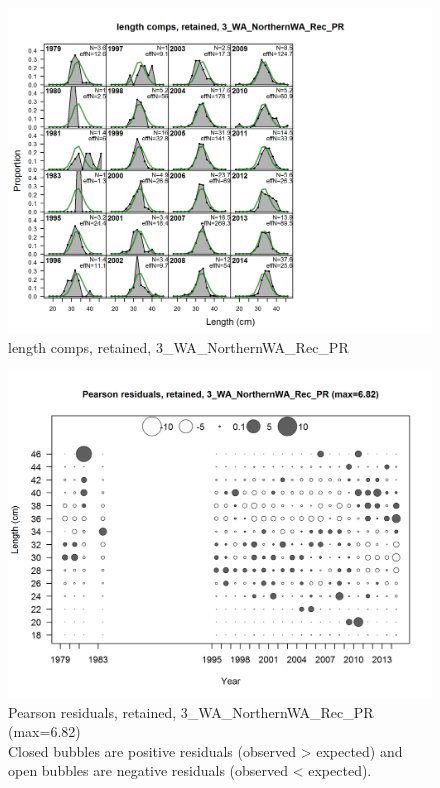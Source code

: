 \documentclass[12pt,]{article}
\begin{document}
\begin{figure}[htbp]
\centering
\includegraphics{./r4ss/plots_mod1/comp_lenfit_flt3mkt2.png}
\caption{length comps, retained, 3\_WA\_NorthernWA\_Rec\_PR
\label{fig:mod1_5_comp_lenfit_flt3mkt2}}
\end{figure}

\begin{figure}[htbp]
\centering
\includegraphics{./r4ss/plots_mod1/comp_lenfit_residsflt3mkt2.png}
\caption{Pearson residuals, retained, 3\_WA\_NorthernWA\_Rec\_PR
(max=6.82)\\
Closed bubbles are positive residuals (observed \textgreater{} expected)
and open bubbles are negative residuals (observed \textless{} expected).
\label{fig:mod1_6_comp_lenfit_residsflt3mkt2}}
\end{figure}
\end{document}
